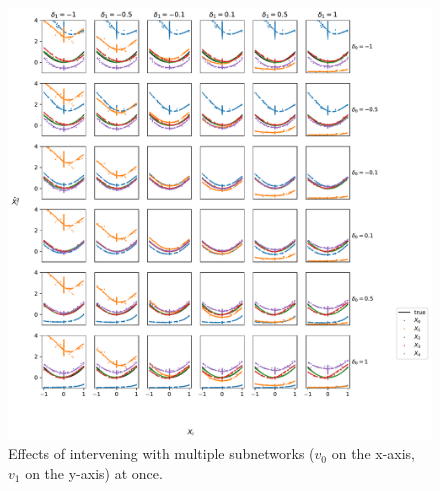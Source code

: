 \documentclass{article}
\theoremstyle{plain}
\theoremstyle{definition}
\theoremstyle{remark}
\begin{document}
\begin{figure}[ht]
    \centerline{\includegraphics[width=\textwidth]{../figures/s9_squared_intervention_multi_features.pdf}}
    \centering
    \caption{Effects of intervening with multiple subnetworks ($v_0$ on the x-axis, $v_1$ on the y-axis) at once.}\label{fig:s9_squared_intervention_multi_features}
\end{figure}


\end{document}
